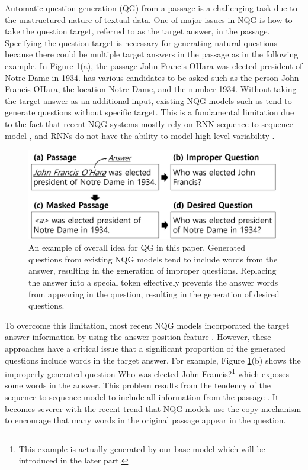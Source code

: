 \documentclass[letterpaper]{article} %
\begin{document}
Automatic question generation (QG) from a passage is a challenging task due to the unstructured nature of textual data. One of major issues in NQG is how to take the question target, referred to as the target answer, in the passage. Specifying the question target is necessary for generating natural questions because there could be multiple target answers in the passage as in the following example. In Figure \ref{fig:replace_a_token}(a), the passage John Francis OHara was elected president of Notre Dame in 1934. has various candidates to be asked such as the person John Francis OHara, the location Notre Dame, and the number 1934. Without taking the target answer as an additional input, existing NQG models such as \cite{du2017learning} tend to generate questions without specific target. This is a fundamental limitation due to the fact that recent NQG systems mostly rely on RNN sequence-to-sequence model \cite{sutskever2014sequence,bahdanau2014neural}, and RNNs do not have the ability to model high-level variability \cite{serban2017hierarchical}.


\begin{figure}[t]
\includegraphics[width = 0.48 \textwidth]{figure_1_flow2.png}
\caption{
An example of overall idea for QG in this paper. Generated questions from existing NQG models tend to include words from the answer, resulting in the generation of improper questions. Replacing the answer into a special token effectively prevents the answer words from appearing in the question, resulting in the generation of desired questions.
}

\label{fig:replace_a_token}
\end{figure}


To overcome this limitation, most recent NQG models incorporated the target answer information by using the answer position feature \cite{zhou2017neural,song2018leveraging}. However, these approaches have a critical issue that a significant proportion of the generated questions include words in the target answer. For example, Figure \ref{fig:replace_a_token}(b) shows the improperly generated question Who was elected John Francis?\footnote{This example is actually generated by our base model which will be introduced in the later part.} which exposes some words in the answer. This problem results from the tendency of the sequence-to-sequence model to include all information from the passage \cite{amplayo2018entity}. It becomes severer with the recent trend that NQG models use the copy mechanism \cite{gulcehre2016pointing} to encourage that many words in the original passage appear in the question.
\end{document}
